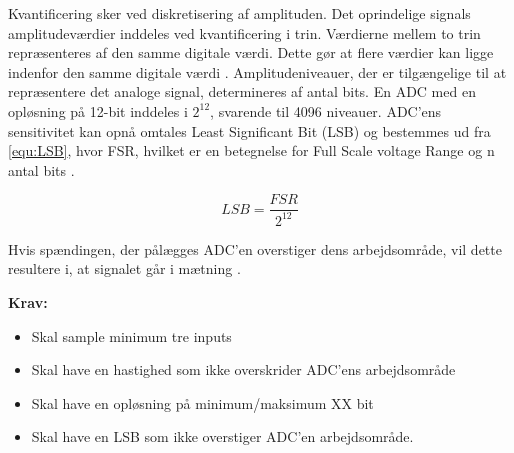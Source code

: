 Kvantificering sker ved diskretisering af amplituden. Det oprindelige signals amplitudeværdier inddeles ved kvantificering i trin. Værdierne mellem to trin repræsenteres af den samme digitale værdi. Dette gør at flere værdier kan ligge indenfor den samme digitale værdi \citep{morre2003}. Amplitudeniveauer, der er tilgængelige til at repræsentere det analoge signal, determineres af antal bits. En ADC med en opløsning på 12-bit inddeles i ${2}^{12}$, svarende til 4096 niveauer. ADC'ens sensitivitet kan opnå omtales Least Significant Bit (LSB) og bestemmes ud fra \autoref{equ:LSB}, hvor FSR, hvilket er en betegnelse for Full Scale voltage Range og n antal bits \citep{webster1998, wolf2004}. 

\begin{equation} \label{equ:LSB}
LSB=\dfrac{FSR}{2^{12}}
\end{equation}

\noindent
Hvis spændingen, der pålægges ADC'en overstiger dens arbejdsområde, vil dette resultere i, at signalet går i mætning \citep{webster1998, wolf2004}. 

\vspace{3mm}
\textbf{Krav:}
\begin{itemize}
\item Skal sample minimum tre inputs 
\item Skal have en hastighed som ikke overskrider ADC'ens arbejdsområde 
\item Skal have en opløsning på minimum/maksimum XX bit 
\item Skal have en LSB som ikke overstiger ADC'en arbejdsområde.
\end{itemize}

